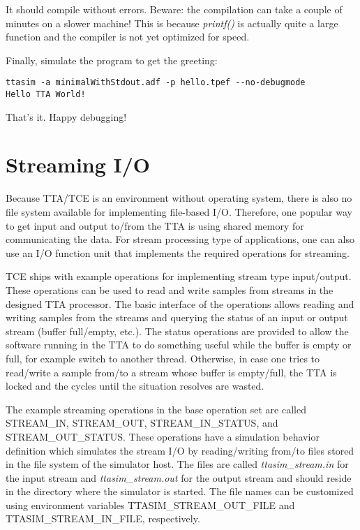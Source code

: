 \documentclass[twoside]{tceusermanual}
\begin{document}
It should compile without errors. Beware: the compilation can take
a couple of minutes on a slower machine! This is because \textit{printf()} 
is actually quite a large function and the compiler is not yet optimized for 
speed.

Finally, simulate the program to get the greeting:

\begin{verbatim}
ttasim -a minimalWithStdout.adf -p hello.tpef --no-debugmode
Hello TTA World!
\end{verbatim}

That's it. Happy debugging!


\section{Streaming I/O}
\label{section:streamIO}

Because TTA/TCE is an environment without operating system, there is also
no file system available for implementing file-based I/O. Therefore, one
popular way to get input and output to/from the TTA is using shared memory
for communicating the data. For stream processing type of applications,
one can also use an I/O function unit that implements the required 
operations for streaming.

TCE ships with example operations for implementing stream type input/output. 
These operations can be used to read and write samples from streams in the
designed TTA processor. The basic interface of the operations allows reading and 
writing samples from the streams and querying the status of an input or output stream 
(buffer full/empty, etc.). The status operations are provided to
allow the software running in the TTA to do something useful while the
buffer is empty or full, for example switch to another thread. Otherwise,
in case one tries to read/write a sample from/to a stream whose buffer is 
empty/full, the TTA is locked and the cycles until the situation resolves
are wasted.

The example streaming operations in the base operation set are 
called STREAM\_IN, STREAM\_OUT, STREAM\_IN\_STATUS, and STREAM\_OUT\_STATUS.
These operations have a simulation behavior definition which simulates the
stream I/O by reading/writing from/to files stored in the file system of 
the simulator host. The files are called \textit{ttasim\_stream.in} for 
the input stream and \textit{ttasim\_stream.out} for the output stream and
should reside in the directory where the simulator is started. 
The file names can be customized using environment variables 
TTASIM\_STREAM\_OUT\_FILE and TTASIM\_STREAM\_IN\_FILE, respectively.
\end{document}
